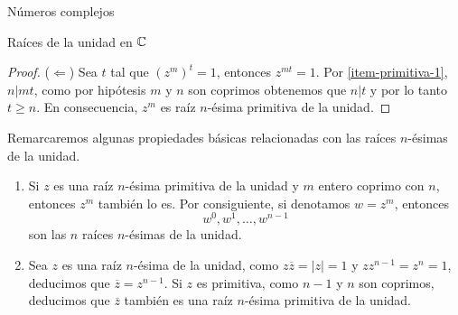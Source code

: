 \begin{chapter}{N\'umeros complejos}
\begin{section}{Raíces de la unidad en $\mathbb C$}
\begin{proof}
        ($\Leftarrow$) Sea $t$ tal que $(z^m)^t = 1$,  entonces $z^{mt} =1$. Por \ref{item-primitiva-1}, $n | mt$, como por hipótesis $m$ y $n$ son coprimos obtenemos que $n |t$ y por lo tanto $t \ge n$. En consecuencia, $z^m$  es raíz $n$-ésima primitiva de la unidad.
    \end{proof}

    \begin{observacion*} Remarcaremos algunas propiedades básicas relacionadas con las raíces $n$-ésimas de la unidad.
        \begin{enumerate}
            \item Si $z$ es una raíz $n$-ésima primitiva de la unidad y $m$  entero coprimo con $n$, entonces ${z}^m$ también lo es.  Por consiguiente, si denotamos $w = z^m$, entonces
                $$
                    w^0, w^1,\ldots,w^{n-1}
                $$
                son las $n$ raíces $n$-ésimas de la unidad.
            \item Sea $z$ es una raíz $n$-ésima de la unidad, como $z\overline{z} = |z| =1$ y $zz^{n-1} = z^n = 1$,  deducimos que $\overline{z} = z^{n-1}$. Si $z$  es primitiva,  como $n-1$ y $n$ son coprimos, deducimos que $\overline{z}$  también es una raíz $n$-ésima primitiva de la unidad.
        \end{enumerate}
    \end{observacion*}



 \end{section}
\end{chapter}





